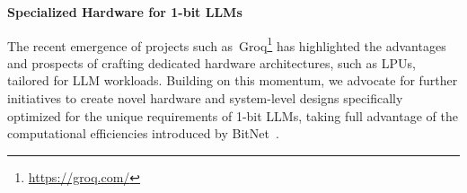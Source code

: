 \textbf{Specialized Hardware for 1-bit LLMs}

The recent emergence of projects such as~Groq\footnote{\url{https://groq.com/}} has highlighted the advantages and prospects of crafting dedicated hardware architectures, such as LPUs, tailored for LLM workloads. Building on this momentum, we advocate for further initiatives to create novel hardware and system-level designs specifically optimized for the unique requirements of 1-bit LLMs, taking full advantage of the computational efficiencies introduced by BitNet~\cite{bitnet}.
